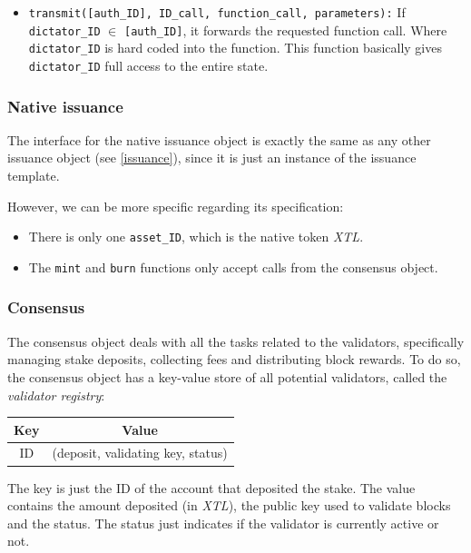 \documentclass[conference]{IEEEtran}
\begin{document}
\begin{itemize}
	\item \texttt{transmit([auth\_ID], ID\_call, function\_call, parameters):} If \texttt{dictator\_ID} $\in$ \texttt{[auth\_ID]}, it forwards the requested function call. Where \texttt{dictator\_ID} is hard coded into the function. This function basically gives \texttt{dictator\_ID} full access to the entire state.
\end{itemize}

\subsubsection{Native issuance}
The interface for the native issuance object is exactly the same as any other issuance object (see \ref{issuance}), since it is just an instance of the issuance template.

However, we can be more specific regarding its specification:

\begin{itemize}
	\item There is only one \texttt{asset\_ID}, which is the native token \textit{XTL}.
	\item The \texttt{mint} and \texttt{burn} functions only accept calls from the consensus object.
\end{itemize}

\subsubsection{Consensus}
The consensus object deals with all the tasks related to the validators, specifically managing stake deposits, collecting fees and distributing block rewards. To do so, the consensus object has a key-value store of all potential validators, called the \textit{validator registry}:

\begin{center}
	\begin{tabular}[c]{c|c}
		Key & Value \\
		\hline
		ID & (deposit, validating key, status) \\
	\end{tabular}
\end{center}

The key is just the ID of the account that deposited the stake. The value contains the amount deposited (in \textit{XTL}), the public key used to validate blocks and the status. The status just indicates if the validator is currently active or not.
\end{document}
